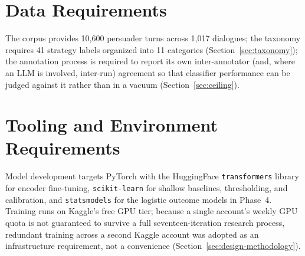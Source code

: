 \section{Data Requirements}

The corpus provides 10{,}600 persuader turns across 1{,}017 dialogues; the
taxonomy requires 41 strategy labels organized into 11 categories
(Section~\ref{sec:taxonomy}); the annotation process is required to report
its own inter-annotator (and, where an LLM is involved, inter-run) agreement
so that classifier performance can be judged against it rather than in a
vacuum (Section~\ref{sec:ceiling}).

\section{Tooling and Environment Requirements}

Model development targets PyTorch with the HuggingFace \texttt{transformers}
library for encoder fine-tuning, \texttt{scikit-learn} for shallow baselines,
thresholding, and calibration, and \texttt{statsmodels} for the logistic
outcome models in Phase~4. Training runs on Kaggle's free GPU tier; because a
single account's weekly GPU quota is not guaranteed to survive a full
seventeen-iteration research process, redundant training across a second
Kaggle account was adopted as an infrastructure requirement, not a
convenience (Section~\ref{sec:design-methodology}).
